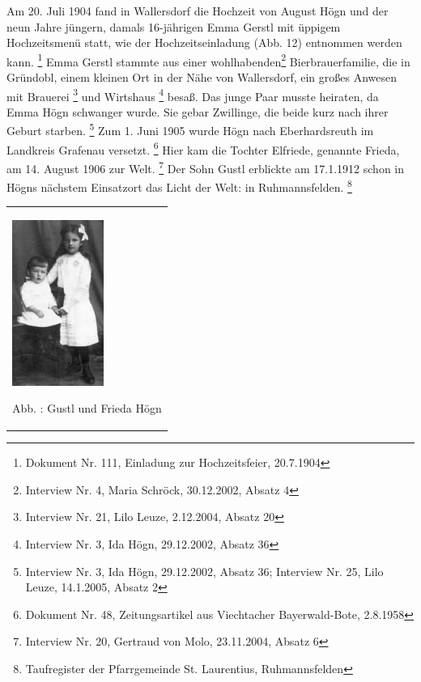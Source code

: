 \documentclass[a4paper]{article}
\newcommand\textstyleFootnoteSymbol[1]{\textsuperscript{#1}}
\newcounter{Abb}
\renewcommand\theAbb{\arabic{Abb}}
\begin{document}
Am 20. Juli 1904 fand in Wallersdorf die Hochzeit von August Högn und
der neun Jahre jüngern, damals 16-jährigen Emma Gerstl mit üppigem
Hochzeitsmenü statt, wie der Hochzeitseinladung (Abb. 12) entnommen
werden kann. \footnote{Dokument Nr. 111, Einladung zur Hochzeitsfeier,
20.7.1904} Emma Gerstl stammte aus einer wohlhabenden\footnote{
Interview Nr. 4, Maria Schröck, 30.12.2002, Absatz 4}
Bierbrauerfamilie,\textstyleFootnoteSymbol{ }die in Gründobl, einem
kleinen Ort in der Nähe von Wallersdorf, ein großes Anwesen mit
Brauerei \footnote{Interview Nr. 21, Lilo Leuze, 2.12.2004, Absatz 20}
und Wirtshaus \footnote{Interview Nr. 3, Ida Högn, 29.12.2002, Absatz
36} besaß. Das junge Paar musste heiraten, da Emma Högn schwanger
wurde. Sie gebar Zwillinge, die beide kurz nach ihrer Geburt
starben. \footnote{Interview Nr. 3, Ida Högn, 29.12.2002, Absatz 36;
Interview Nr. 25, Lilo Leuze, 14.1.2005, Absatz 2} Zum 1. Juni 1905
wurde Högn nach Eberhardsreuth im Landkreis Grafenau
versetzt. \footnote{Dokument Nr. 48, Zeitungsartikel aus Viechtacher
Bayerwald-Bote, 2.8.1958} Hier kam die Tochter Elfriede, genannte
Frieda, am 14. August 1906 zur Welt. \footnote{Interview Nr. 20,
Gertraud von Molo, 23.11.2004, Absatz 6} Der Sohn Gustl erblickte am
17.1.1912 schon in Högns nächstem Einsatzort das Licht der Welt: in
Ruhmannsfelden. \footnote{Taufregister der Pfarrgemeinde St.
Laurentius, Ruhmannsfelden}

\begin{center}
\begin{minipage}{3.373cm}
\begin{center}
\tablefirsthead{}
\tablehead{}
\tabletail{}
\tablelasttail{}
\begin{supertabular}{m{3.1729999cm}}

\includegraphics[width=2.99cm,height=5.408cm]{pictures/zulassungsarbeit-img015.jpg}

Abb. \stepcounter{Abb}{\theAbb}: Gustl und Frieda Högn\\
\end{supertabular}
\end{center}
\end{minipage}
\end{center}
\end{document}
